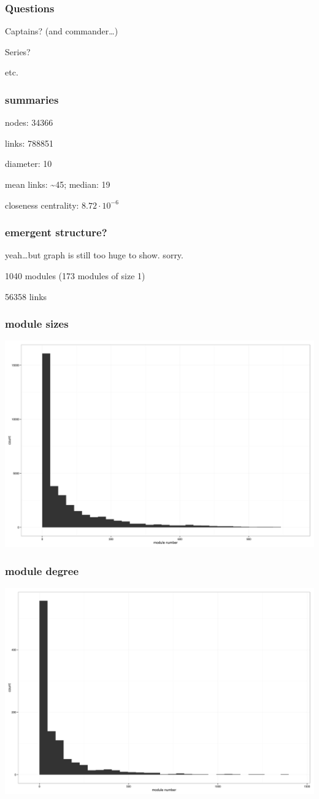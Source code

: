 \documentclass{beamer}
\begin{document}
\begin{frame}
  \frametitle{Questions}
  \huge{Captains? (and commander\ldots )}

  \huge{Series?}

  \huge{etc.}
\end{frame}

\begin{frame}
  \frametitle{summaries}

  nodes: 34366

  links: 788851

  diameter: 10

  mean links: \~ {}45; median: 19

  closeness centrality: \(8.72 \cdot 10^{-6}\)
\end{frame}

\begin{frame}
  \frametitle{emergent structure?}
  yeah\ldots but graph is still too huge to show. sorry.

  1040 modules (173 modules of size 1)

  56358 links
\end{frame}

\begin{frame}
  \frametitle{module sizes}
  \includegraphics[height = 0.8\textheight, keepaspectratio = true]{figure/modules}
\end{frame}

\begin{frame}
  \frametitle{module degree}
  \includegraphics[height = 0.8\textheight, keepaspectratio = true]{figure/mod_deg}
\end{frame}
\end{document}
